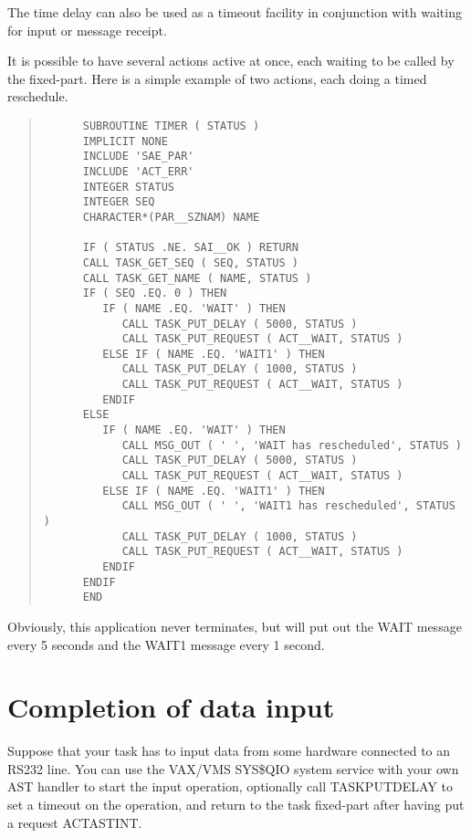 \documentclass[twoside,11pt]{article}
\newcommand{\xlabel}[1]{}
\renewcommand{\_}{\texttt{\symbol{95}}}
\begin{document}
The time delay can also be used as a timeout facility in conjunction
with waiting for input or message receipt.

It is possible to have several actions active at once, each waiting to
be called by the fixed-part. Here is a simple example of two actions,
each doing a timed reschedule.

\small \begin{quote} \begin{verbatim}
      SUBROUTINE TIMER ( STATUS )
      IMPLICIT NONE
      INCLUDE 'SAE_PAR'
      INCLUDE 'ACT_ERR'
      INTEGER STATUS
      INTEGER SEQ
      CHARACTER*(PAR__SZNAM) NAME

      IF ( STATUS .NE. SAI__OK ) RETURN
      CALL TASK_GET_SEQ ( SEQ, STATUS )
      CALL TASK_GET_NAME ( NAME, STATUS )
      IF ( SEQ .EQ. 0 ) THEN
         IF ( NAME .EQ. 'WAIT' ) THEN
            CALL TASK_PUT_DELAY ( 5000, STATUS )
            CALL TASK_PUT_REQUEST ( ACT__WAIT, STATUS )
         ELSE IF ( NAME .EQ. 'WAIT1' ) THEN
            CALL TASK_PUT_DELAY ( 1000, STATUS )
            CALL TASK_PUT_REQUEST ( ACT__WAIT, STATUS )
         ENDIF
      ELSE
         IF ( NAME .EQ. 'WAIT' ) THEN
            CALL MSG_OUT ( ' ', 'WAIT has rescheduled', STATUS )
            CALL TASK_PUT_DELAY ( 5000, STATUS )
            CALL TASK_PUT_REQUEST ( ACT__WAIT, STATUS )
         ELSE IF ( NAME .EQ. 'WAIT1' ) THEN
            CALL MSG_OUT ( ' ', 'WAIT1 has rescheduled', STATUS )
            CALL TASK_PUT_DELAY ( 1000, STATUS )
            CALL TASK_PUT_REQUEST ( ACT__WAIT, STATUS )
         ENDIF
      ENDIF
      END
\end{verbatim} \end{quote} \normalsize

Obviously, this application never terminates, but will put out the WAIT
message every 5 seconds and the WAIT1 message every 1 second.

\section{Completion of data input\xlabel{completion_of_data_input}}

Suppose that your task has to input data from some hardware connected to
an RS232 line. You can use the VAX/VMS SYS\$QIO system service with your
own AST handler to start the input operation, optionally call
TASK\_PUT\_DELAY to set a timeout on the operation, and return
to the task fixed-part after having put a request ACT\_\_ASTINT.
\end{document}
